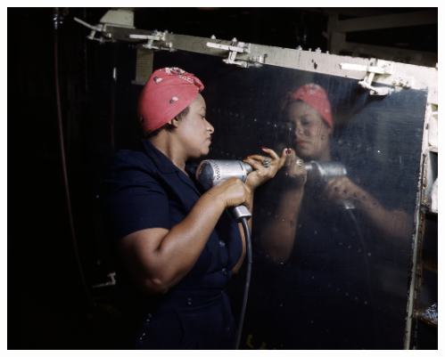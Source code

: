 \documentclass[presentation]{subfiles}
\begin{document}
\begin{frame}
{\begin{columns}[T]
\begin{column}{0.33\textwidth}
    \end{column}
    \begin{column}{0.33\textwidth}
      \centering
      \includegraphics[max width=\linewidth,max height=.3\textheight,keepaspectratio]{../common_figures/photo/Rosie_the_Riveter_(Vultee)_DS.jpg}
    \end{column}
  \end{columns}
  \vspace*{7mm}
  }
  

\end{frame}
\end{document}
